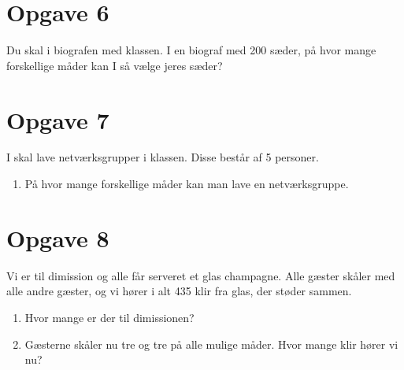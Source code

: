 \section*{Opgave 6}
Du skal i biografen med klassen. I en biograf med 200 sæder, på hvor mange forskellige måder kan I så vælge jeres sæder?

\section*{Opgave 7}
I skal lave netværksgrupper i klassen. Disse består af 5 personer.
\begin{enumerate}[label=\roman*)]
	\item På hvor mange forskellige måder kan man lave en netværksgruppe.
\end{enumerate}

\section*{Opgave 8}
Vi er til dimission og alle får serveret et glas champagne. Alle gæster skåler med alle andre gæster, og vi hører i alt 435 klir fra glas, der støder sammen.
\begin{enumerate}[label=\roman*)]
	\item Hvor mange er der til dimissionen?
	\item Gæsterne skåler nu tre og tre på alle mulige måder. Hvor mange klir hører vi nu?
\end{enumerate}

